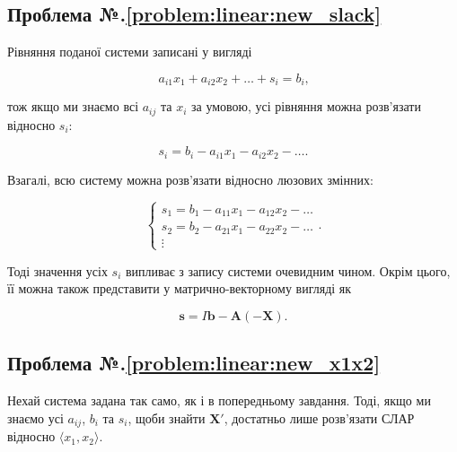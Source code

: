 \documentclass[\main/book.tex]{subfiles}
\begin{document}
\subsection*{Проблема №.\ref{problem:linear:new_slack}}

Рівняння поданої системи записані у вигляді

\[
 a_{i1} x_1 + a_{i2} x_2 + \ldots + s_i = b_i
 \text{,}
\]

тож якщо ми знаємо всі $a_{ij}$ та $x_i$ за умовою, усі рівняння можна розв'язати відносно $s_i$:

\[
 s_i = b_i - a_{i1} x_1 - a_{i2} x_2 - \ldots
 \text{.}
\]

Взагалі, всю систему можна розв'язати відносно люзових змінних:

\[
 \left\{\begin{array}{l}
  s_1 = b_1 - a_{11} x_1 - a_{12} x_2 - \ldots \\
  s_2 = b_2 - a_{21} x_1 - a_{22} x_2 - \ldots \\
  \vdots
 \end{array}\right.
 \text{.}
\]

Тоді значення усіх $s_i$ випливає з запису системи очевидним чином. Окрім цього, її можна також представити у матрично-векторному вигляді як

\[
 \mathbf{s} = I \mathbf{b} - \mathbf{A}(-\mathbf{X})
 \text{.}
\]

\subsection*{Проблема №.\ref{problem:linear:new_x1x2}}

Нехай система задана так само, як і в попередньому завдання. Тоді, якщо ми знаємо усі $a_{ij}$, $b_i$ та $s_i$, щоби знайти $\mathbf{X}'$, достатньо лише розв'язати СЛАР відносно $\langle x_1, x_2 \rangle$.
\end{document}
